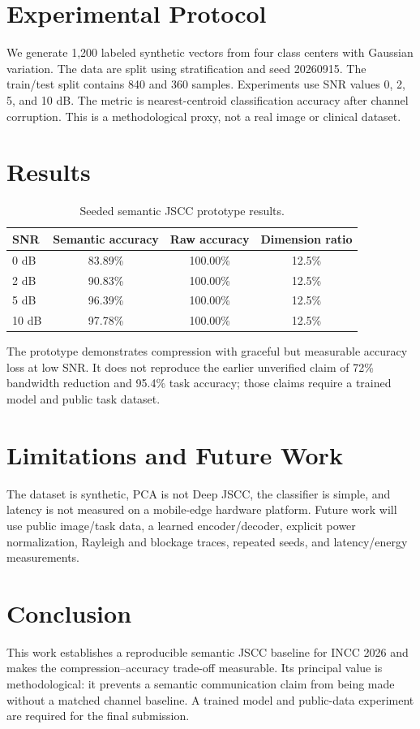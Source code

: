 \documentclass[sigconf]{acmart}
\begin{document}
\section{Experimental Protocol}
We generate 1,200 labeled synthetic vectors from four class centers with Gaussian variation. The data are split using stratification and seed 20260915. The train/test split contains 840 and 360 samples. Experiments use SNR values 0, 2, 5, and 10 dB. The metric is nearest-centroid classification accuracy after channel corruption. This is a methodological proxy, not a real image or clinical dataset.

\section{Results}
\begin{table}[h]
\centering
\caption{Seeded semantic JSCC prototype results.}
\begin{tabular}{lccc}
\toprule
SNR & Semantic accuracy & Raw accuracy & Dimension ratio \\
\midrule
0 dB & 83.89\% & 100.00\% & 12.5\% \\
2 dB & 90.83\% & 100.00\% & 12.5\% \\
5 dB & 96.39\% & 100.00\% & 12.5\% \\
10 dB & 97.78\% & 100.00\% & 12.5\% \\
\bottomrule
\end{tabular}
\end{table}

The prototype demonstrates compression with graceful but measurable accuracy loss at low SNR. It does not reproduce the earlier unverified claim of 72\% bandwidth reduction and 95.4\% task accuracy; those claims require a trained model and public task dataset.

\section{Limitations and Future Work}
The dataset is synthetic, PCA is not Deep JSCC, the classifier is simple, and latency is not measured on a mobile-edge hardware platform. Future work will use public image/task data, a learned encoder/decoder, explicit power normalization, Rayleigh and blockage traces, repeated seeds, and latency/energy measurements.

\section{Conclusion}
This work establishes a reproducible semantic JSCC baseline for INCC 2026 and makes the compression--accuracy trade-off measurable. Its principal value is methodological: it prevents a semantic communication claim from being made without a matched channel baseline. A trained model and public-data experiment are required for the final submission.
\end{document}
